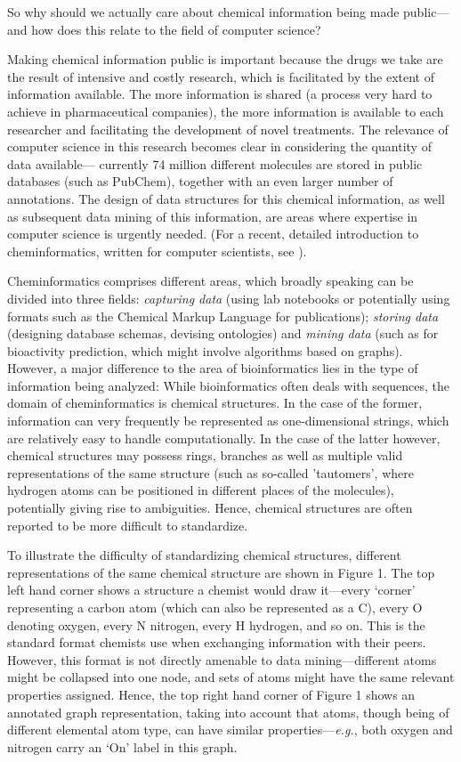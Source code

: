 \documentclass{sig-alternate}
\begin{document}
So why should we actually care about chemical information being made
public---and how does this relate to the field of computer science?

Making chemical information public is important because the
drugs we take are the result of intensive and costly research,
which is facilitated by the extent of information available. The
more information is shared (a process very hard to achieve
in pharmaceutical companies), the more information is available to each
researcher and facilitating the development of
novel treatments. The relevance of computer
science in this research becomes clear in considering the quantity of data available---
currently 74 million different molecules are stored in
public databases (such as PubChem), together with an even larger number of annotations.
The design of data structures for this chemical information, as well as subsequent
data mining of this information, are areas where expertise in computer
science is urgently needed. (For a recent, detailed introduction to
cheminformatics, written for computer scientists, see
\cite{brown2009}).

Cheminformatics comprises different areas, which broadly speaking can be divided
into three fields: \emph{capturing data} (using lab notebooks or potentially using
formats such as the Chemical Markup Language for publications); \emph{storing data}
(designing database schemas, devising ontologies) and \emph{mining data} (such as for
bioactivity prediction, which might involve algorithms based on graphs).
However, a major difference to the area of bioinformatics lies in the type of
information being analyzed: While bioinformatics often deals with sequences, the
domain of cheminformatics is chemical structures. In the case of the former,
information can very frequently be represented as one-dimensional strings, which
are relatively easy to handle computationally. In the case of the latter however, chemical
structures may possess rings, branches as well as multiple valid representations
of the same structure (such as so-called 'tautomers', where hydrogen atoms can be positioned in different places of the molecules), potentially giving rise to ambiguities. Hence,
chemical structures are often reported to be more difficult to standardize.

To illustrate the difficulty of standardizing chemical structures, different
representations of the same chemical structure are shown in Figure 1. The top
left hand corner shows a structure a chemist would draw it---every `corner'
representing a carbon atom (which can also be represented as a C), every O
denoting oxygen, every N nitrogen, every H hydrogen, and so on. This is the
standard format chemists use when exchanging information with their peers.
However, this format is not directly amenable to data mining---different atoms might
be collapsed into one node, and sets of atoms might have the same relevant
properties assigned. Hence, the top right hand corner of Figure 1 shows an
annotated graph representation, taking into account that atoms, though being of
different elemental atom type, can have similar properties---\emph{e.g.}, both oxygen
and nitrogen carry an `On' label in this graph. 
\end{document}
